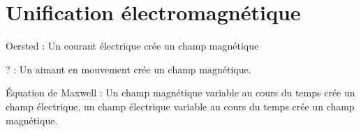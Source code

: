 
\section{Unification électromagnétique}
%

Oersted : Un courant électrique crée un champ magnétique

? : Un aimant en mouvement crée un champ magnétique.

Équation de Maxwell : Un champ magnétique variable au cours du temps crée un champ électrique, un champ électrique variable au cours du temps crée un champ magnétique.




